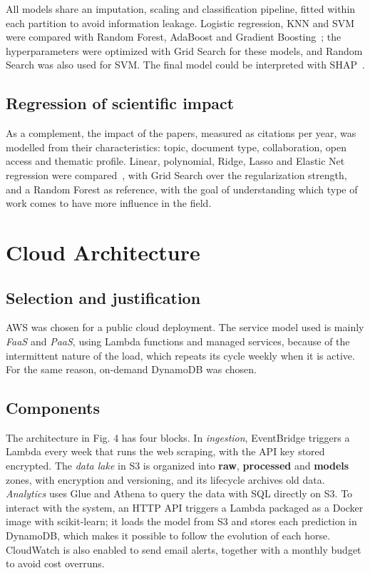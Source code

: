 \documentclass[conference,a4paper]{IEEEtran}
\begin{document}
All models share an imputation, scaling and classification pipeline, fitted within each partition to avoid information leakage. Logistic regression, KNN and SVM were compared with Random Forest, AdaBoost and Gradient Boosting~\cite{breiman2001}; the hyperparameters were optimized with Grid Search for these models, and Random Search was also used for SVM. The final model could be interpreted with SHAP~\cite{lundberg2017}.

\subsection{Regression of scientific impact}

As a complement, the impact of the papers, measured as citations per year, was modelled from their characteristics: topic, document type, collaboration, open access and thematic profile. Linear, polynomial, Ridge, Lasso and Elastic Net regression were compared~\cite{tibshirani1996,zou2005}, with Grid Search over the regularization strength, and a Random Forest as reference, with the goal of understanding which type of work comes to have more influence in the field.

\section{Cloud Architecture}

\subsection{Selection and justification}

AWS was chosen for a public cloud deployment. The service model used is mainly \emph{FaaS} and \emph{PaaS}, using Lambda functions and managed services, because of the intermittent nature of the load, which repeats its cycle weekly when it is active. For the same reason, on-demand DynamoDB was chosen.

\subsection{Components}

The architecture in Fig. 4 has four blocks. In \emph{ingestion}, EventBridge triggers a Lambda every week that runs the web scraping, with the API key stored encrypted. The \emph{data lake} in S3 is organized into \textbf{raw}, \textbf{processed} and \textbf{models} zones, with encryption and versioning, and its lifecycle archives old data. \emph{Analytics} uses Glue and Athena to query the data with SQL directly on S3. To interact with the system, an HTTP API triggers a Lambda packaged as a Docker image with scikit-learn; it loads the model from S3 and stores each prediction in DynamoDB, which makes it possible to follow the evolution of each horse. CloudWatch is also enabled to send email alerts, together with a monthly budget to avoid cost overruns.
\end{document}
